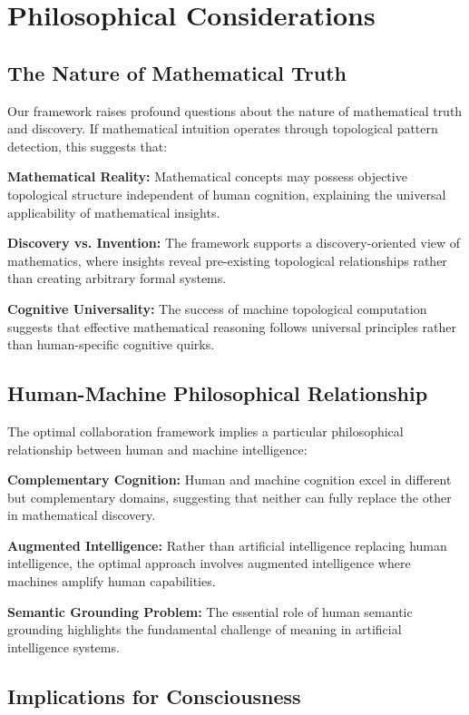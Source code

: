 \documentclass[11pt]{article}
\begin{document}
\section{Philosophical Considerations}

\subsection{The Nature of Mathematical Truth}

Our framework raises profound questions about the nature of mathematical truth and discovery. If mathematical intuition operates through topological pattern detection, this suggests that:

\textbf{Mathematical Reality:} Mathematical concepts may possess objective topological structure independent of human cognition, explaining the universal applicability of mathematical insights.

\textbf{Discovery vs. Invention:} The framework supports a discovery-oriented view of mathematics, where insights reveal pre-existing topological relationships rather than creating arbitrary formal systems.

\textbf{Cognitive Universality:} The success of machine topological computation suggests that effective mathematical reasoning follows universal principles rather than human-specific cognitive quirks.

\subsection{Human-Machine Philosophical Relationship}

The optimal collaboration framework implies a particular philosophical relationship between human and machine intelligence:

\textbf{Complementary Cognition:} Human and machine cognition excel in different but complementary domains, suggesting that neither can fully replace the other in mathematical discovery.

\textbf{Augmented Intelligence:} Rather than artificial intelligence replacing human intelligence, the optimal approach involves augmented intelligence where machines amplify human capabilities.

\textbf{Semantic Grounding Problem:} The essential role of human semantic grounding highlights the fundamental challenge of meaning in artificial intelligence systems.

\subsection{Implications for Consciousness}
\end{document}
